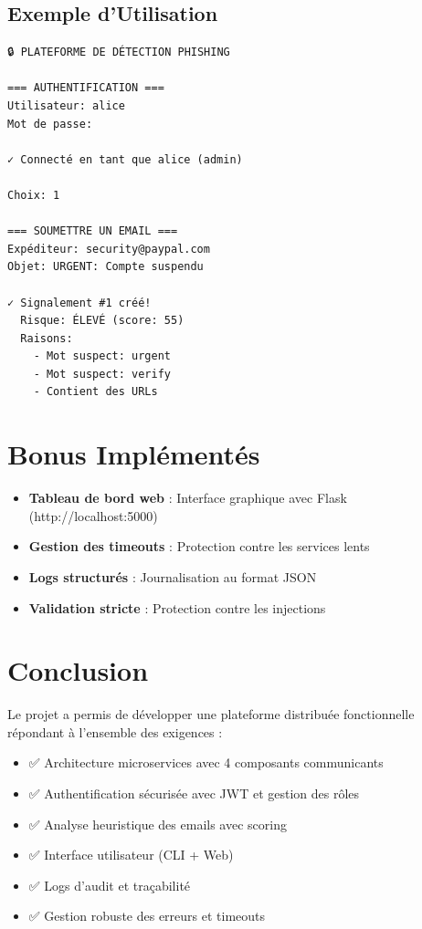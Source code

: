 \documentclass[12pt,a4paper]{article}
\begin{document}
\subsection{Exemple d'Utilisation}

\begin{verbatim}
🔒 PLATEFORME DE DÉTECTION PHISHING

=== AUTHENTIFICATION ===
Utilisateur: alice
Mot de passe: 

✓ Connecté en tant que alice (admin)

Choix: 1

=== SOUMETTRE UN EMAIL ===
Expéditeur: security@paypal.com
Objet: URGENT: Compte suspendu

✓ Signalement #1 créé!
  Risque: ÉLEVÉ (score: 55)
  Raisons:
    - Mot suspect: urgent
    - Mot suspect: verify
    - Contient des URLs
\end{verbatim}

\section{Bonus Implémentés}

\begin{itemize}
    \item \textbf{Tableau de bord web} : Interface graphique avec Flask (http://localhost:5000)
    \item \textbf{Gestion des timeouts} : Protection contre les services lents
    \item \textbf{Logs structurés} : Journalisation au format JSON
    \item \textbf{Validation stricte} : Protection contre les injections
\end{itemize}

\section{Conclusion}

Le projet a permis de développer une plateforme distribuée fonctionnelle répondant à l'ensemble des exigences :

\begin{itemize}
    \item ✅ Architecture microservices avec 4 composants communicants
    \item ✅ Authentification sécurisée avec JWT et gestion des rôles
    \item ✅ Analyse heuristique des emails avec scoring
    \item ✅ Interface utilisateur (CLI + Web)
    \item ✅ Logs d'audit et traçabilité
    \item ✅ Gestion robuste des erreurs et timeouts
\end{itemize}
\end{document}
